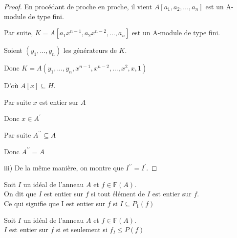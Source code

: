 \begin{proof}
	En procédant de proche en proche, il vient $A[a_{1},a_{2},...,a_{n}]$
	est un A-module de type fini.
	
	Par suite, $K=A[a_{1}x^{n-1},a_{2}x^{n-2},...,a_{n}]$ est un A-module de
	type fini.
	
	Soient $(y_{1},...,y_{n})$ les générateurs de $K.$
	
	Donc $K=A(y_{1},...,y_{n},x^{n-1},x^{n-2},...,x^{2},x,1)$
	
	D'où $A[x]\subseteq H.$
	
	Par suite $x$ est entier sur $A$
	
	Donc $x\in A^{\prime }$
	
	Par suite $A^{\prime \prime }\subseteq A$
	
	Donc  $A^{\prime \prime }=A$
	
	iii) De la m\^{e}me manière, on montre que $I^{\prime \prime }=I^{\prime
	}.$
\end{proof}
\begin{madefinition}
	Soit $I$ un idéal de l'anneau $A$ et $f \in \mathbb{F}(A)$. \\
	On dit que $I$ est entier sur $f$ si tout élément de $I$ est entier sur $f$. \\
	Ce qui signifie que I est entier sur $f$ si $I \subseteq P_1(f)$
\end{madefinition}
\begin{maconsequence}
	Soit $I$ un idéal de l'anneau $A$ et $f \in \mathbb{F}(A)$. \\
	$I$ est entier sur $f$ si et seulement si $f_I \leqslant P(f)$
\end{maconsequence}
